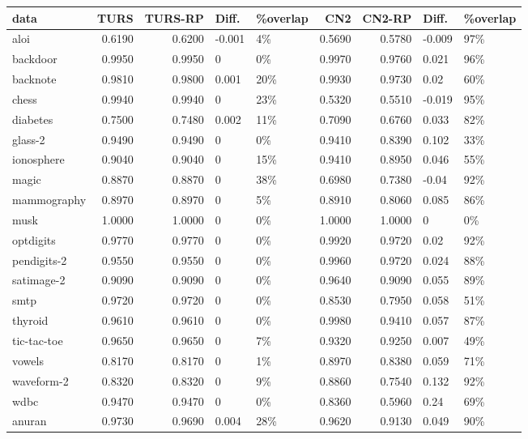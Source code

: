 \begin{table}[ht]
\centering
\small
\begin{tabular}{l|rrll|rrll}
  \hline
data & TURS & TURS-RP & Diff. & \%overlap & CN2 & CN2-RP & Diff. & \%overlap \\ 
  \hline
aloi & 0.6190 & 0.6200 & -0.001 & 4\% & 0.5690 & 0.5780 & -0.009 & 97\% \\ 
  backdoor & 0.9950 & 0.9950 & 0 & 0\% & 0.9970 & 0.9760 & 0.021 & 96\% \\ 
  backnote & 0.9810 & 0.9800 & 0.001 & 20\% & 0.9930 & 0.9730 & 0.02 & 60\% \\ 
  chess & 0.9940 & 0.9940 & 0 & 23\% & 0.5320 & 0.5510 & -0.019 & 95\% \\ 
  diabetes & 0.7500 & 0.7480 & 0.002 & 11\% & 0.7090 & 0.6760 & 0.033 & 82\% \\ 
  glass-2 & 0.9490 & 0.9490 & 0 & 0\% & 0.9410 & 0.8390 & 0.102 & 33\% \\ 
  ionosphere & 0.9040 & 0.9040 & 0 & 15\% & 0.9410 & 0.8950 & 0.046 & 55\% \\ 
  magic & 0.8870 & 0.8870 & 0 & 38\% & 0.6980 & 0.7380 & -0.04 & 92\% \\ 
  mammography & 0.8970 & 0.8970 & 0 & 5\% & 0.8910 & 0.8060 & 0.085 & 86\% \\ 
  musk & 1.0000 & 1.0000 & 0 & 0\% & 1.0000 & 1.0000 & 0 & 0\% \\ 
  optdigits & 0.9770 & 0.9770 & 0 & 0\% & 0.9920 & 0.9720 & 0.02 & 92\% \\ 
  pendigits-2 & 0.9550 & 0.9550 & 0 & 0\% & 0.9960 & 0.9720 & 0.024 & 88\% \\ 
  satimage-2 & 0.9090 & 0.9090 & 0 & 0\% & 0.9640 & 0.9090 & 0.055 & 89\% \\ 
  smtp & 0.9720 & 0.9720 & 0 & 0\% & 0.8530 & 0.7950 & 0.058 & 51\% \\ 
  thyroid & 0.9610 & 0.9610 & 0 & 0\% & 0.9980 & 0.9410 & 0.057 & 87\% \\ 
  tic-tac-toe & 0.9650 & 0.9650 & 0 & 7\% & 0.9320 & 0.9250 & 0.007 & 49\% \\ 
  vowels & 0.8170 & 0.8170 & 0 & 1\% & 0.8970 & 0.8380 & 0.059 & 71\% \\ 
  waveform-2 & 0.8320 & 0.8320 & 0 & 9\% & 0.8860 & 0.7540 & 0.132 & 92\% \\ 
  wdbc & 0.9470 & 0.9470 & 0 & 0\% & 0.8360 & 0.5960 & 0.24 & 69\% \\ 
  anuran & 0.9730 & 0.9690 & 0.004 & 28\% & 0.9620 & 0.9130 & 0.049 & 90\% \\ 

\end{tabular}
\end{table}
